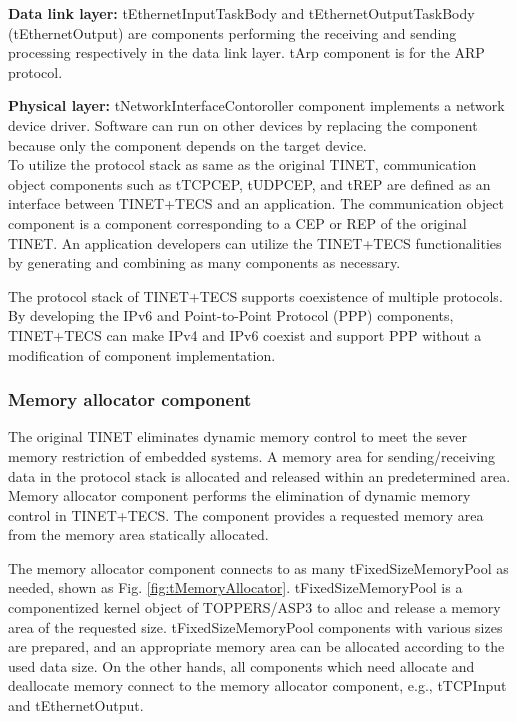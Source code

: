\documentclass[conference]{IEEEtran/IEEEtran}
\begin{document}
{\bf Data link layer:}
tEthernetInputTaskBody and tEthernetOutputTaskBody (tEthernetOutput) are components performing the receiving and sending processing respectively in the data link layer.
tArp component is for the ARP protocol.

{\bf Physical layer:}
tNetworkInterfaceContoroller component implements a network device driver.
Software can run on other devices by replacing the component because only the component depends on the target device.\\

To utilize the protocol stack as same as the original TINET, communication object components such as tTCPCEP, tUDPCEP, and tREP are defined as an interface between TINET+TECS and an application.
The communication object component is a component corresponding to a CEP or REP of the original TINET.
An application developers can utilize the TINET+TECS functionalities by generating and combining as many components as necessary.

The protocol stack of TINET+TECS supports coexistence of multiple protocols.
By developing the IPv6 and Point-to-Point Protocol (PPP) components, TINET+TECS can make IPv4 and IPv6 coexist and support PPP without a modification of component implementation.

\subsubsection{Memory allocator component} 

The original TINET eliminates dynamic memory control to meet the sever memory restriction of embedded systems.
A memory area for sending/receiving data in the protocol stack is allocated and released within an predetermined area.
Memory allocator component performs the elimination of dynamic memory control in TINET+TECS.
The component provides a requested memory area from the memory area statically allocated.

The memory allocator component connects to as many tFixedSizeMemoryPool as needed, shown as Fig. \ref{fig:tMemoryAllocator}.
tFixedSizeMemoryPool is a componentized kernel object of TOPPERS/ASP3 to alloc and release a memory area of the requested size. 
tFixedSizeMemoryPool components with various sizes are prepared, and an appropriate memory area can be allocated according to the used data size.
On the other hands, all components which need allocate and deallocate memory connect to the memory allocator component, e.g., tTCPInput and tEthernetOutput.
\end{document}
